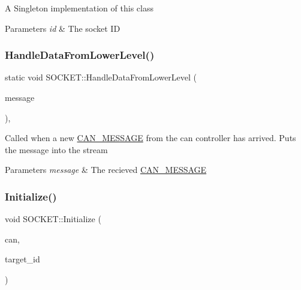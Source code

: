 A Singleton implementation of this class 
\begin{DoxyParams}{Parameters}
{\em id} & The socket ID \\
\hline
\end{DoxyParams}
\hypertarget{class_s_o_c_k_e_t_ab1345aded87c899fd525616b6f2cca4a}{}\label{class_s_o_c_k_e_t_ab1345aded87c899fd525616b6f2cca4a} 
\subsubsection{\texorpdfstring{Handle\+Data\+From\+Lower\+Level()}{HandleDataFromLowerLevel()}}
{\footnotesize\ttfamily static void S\+O\+C\+K\+E\+T\+::\+Handle\+Data\+From\+Lower\+Level (\begin{DoxyParamCaption}\item[{\hyperlink{struct_c_a_n___m_e_s_s_a_g_e}{C\+A\+N\+\_\+\+M\+E\+S\+S\+A\+GE} \&}]{message }\end{DoxyParamCaption})\hspace{0.3cm}{\ttfamily [inline]}, {\ttfamily [static]}}

Called when a new \hyperlink{struct_c_a_n___m_e_s_s_a_g_e}{C\+A\+N\+\_\+\+M\+E\+S\+S\+A\+GE} from the can controller has arrived. Puts the message into the stream 
\begin{DoxyParams}{Parameters}
{\em message} & The recieved \hyperlink{struct_c_a_n___m_e_s_s_a_g_e}{C\+A\+N\+\_\+\+M\+E\+S\+S\+A\+GE} \\
\hline
\end{DoxyParams}
\hypertarget{class_s_o_c_k_e_t_a883fe771ed7afbc3373d1a7a8bb363ba}{}\label{class_s_o_c_k_e_t_a883fe771ed7afbc3373d1a7a8bb363ba} 
\subsubsection{\texorpdfstring{Initialize()}{Initialize()}}
{\footnotesize\ttfamily void S\+O\+C\+K\+E\+T\+::\+Initialize (\begin{DoxyParamCaption}\item[{\hyperlink{class_c_a_n}{C\+AN} $\ast$}]{can,  }\item[{uint8\+\_\+t}]{target\+\_\+id }\end{DoxyParamCaption})\hspace{0.3cm}{\ttfamily [inline]}}

